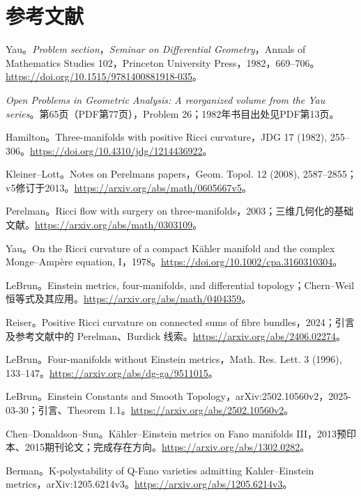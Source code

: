 \documentclass[11pt,a4paper]{article}
\theoremstyle{definition}
\begin{document}
\newpage
\section{参考文献}
\begin{enumerate}[label={[\arabic*]},leftmargin=2.2em,itemsep=0.55em]
\raggedright
\item Yau。\emph{Problem section}，\emph{Seminar on Differential Geometry}，Annals of Mathematics Studies 102，Princeton University Press，1982，669--706。\url{https://doi.org/10.1515/9781400881918-035}。
\item \emph{Open Problems in Geometric Analysis: A reorganized volume from the Yau series}。第65页（PDF第77页），Problem 26；1982年书目出处见PDF第13页。
\item Hamilton。Three-manifolds with positive Ricci curvature，JDG 17 (1982), 255--306。\url{https://doi.org/10.4310/jdg/1214436922}。
\item Kleiner--Lott。Notes on Perelman\textquotesingle s papers，Geom. Topol. 12 (2008), 2587--2855；v5修订于2013。\url{https://arxiv.org/abs/math/0605667v5}。
\item Perelman。Ricci flow with surgery on three-manifolds，2003；三维几何化的基础文献。\url{https://arxiv.org/abs/math/0303109}。
\item Yau。On the Ricci curvature of a compact Kähler manifold and the complex Monge--Ampère equation, I，1978。\url{https://doi.org/10.1002/cpa.3160310304}。
\item LeBrun。Einstein metrics, four-manifolds, and differential topology；Chern--Weil 恒等式及其应用。\url{https://arxiv.org/abs/math/0404359}。
\item Reiser。Positive Ricci curvature on connected sums of fibre bundles，2024；引言及参考文献中的 Perelman、Burdick 线索。\url{https://arxiv.org/abs/2406.02274}。
\item LeBrun。Four-manifolds without Einstein metrics，Math. Res. Lett. 3 (1996), 133--147。\url{https://arxiv.org/abs/dg-ga/9511015}。
\item LeBrun。Einstein Constants and Smooth Topology，arXiv:2502.10560v2，2025-03-30；引言、Theorem 1.1。\url{https://arxiv.org/abs/2502.10560v2}。
\item Chen--Donaldson--Sun。Kähler--Einstein metrics on Fano manifolds III，2013预印本、2015期刊论文；完成存在方向。\url{https://arxiv.org/abs/1302.0282}。
\item Berman。K-polystability of Q-Fano varieties admitting Kahler--Einstein metrics，arXiv:1205.6214v3。\url{https://arxiv.org/abs/1205.6214v3}。

\end{enumerate}
\end{document}
